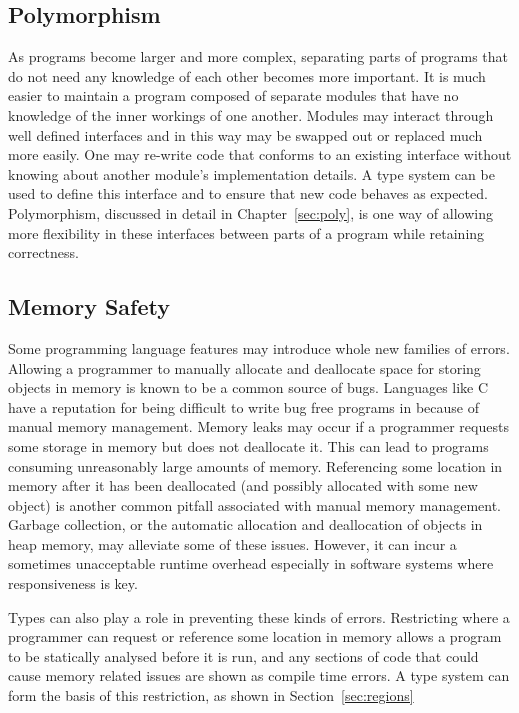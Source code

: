 \subsection{Polymorphism}
As programs become larger and more complex, separating parts of programs that
do not need any knowledge of each other becomes more important. It is much
easier to maintain a program composed of separate modules that have no
knowledge of the inner workings of one another. Modules may interact through
well defined interfaces and in this way may be swapped out or replaced much
more easily. One may re-write code that conforms to an existing interface
without knowing about another module's implementation details. A type system can
be used to define this interface and to ensure that new code behaves as
expected. Polymorphism, discussed in detail in Chapter~\ref{sec:poly}, is
one way of allowing more flexibility in these interfaces between parts of a
program while retaining correctness.

\subsection{Memory Safety}
Some programming language features may introduce whole new families of errors.
Allowing a programmer to manually allocate and deallocate space for storing
objects in memory is known to be a common source of bugs. Languages like C have
a reputation for being difficult to write bug free programs in because of
manual memory management. Memory leaks may occur if a programmer requests some
storage in memory but does not deallocate it. This can lead to programs
consuming unreasonably large amounts of memory. Referencing some location in
memory after it has been deallocated (and possibly allocated with some new
object) is another common pitfall associated with manual memory management.
Garbage collection, or the automatic allocation and deallocation of objects in
heap memory, may alleviate some of these issues.  However, it can incur a
sometimes unacceptable runtime overhead especially in software systems where
responsiveness is key.

Types can also play a role in preventing these kinds of errors. Restricting
where a programmer can request or reference some location in memory allows a
program to be statically analysed before it is run, and any sections of code
that could cause memory related issues are shown as compile time errors.  A
type system can form the basis of this restriction, as shown in
Section~\ref{sec:regions}

